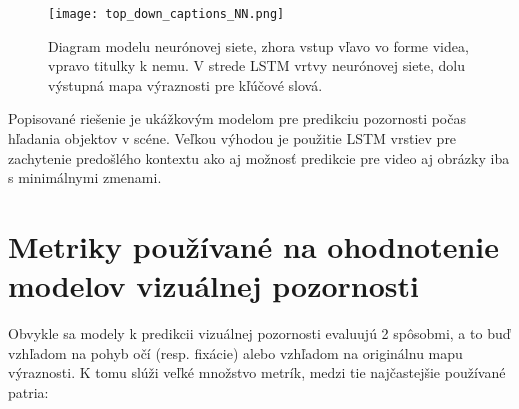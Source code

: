\begin{figure}[H]
	\begin{center}
		\texttt{[image: top\_down\_captions\_NN.png]}
		\caption[Model neurónovej siete pre predikciu na základe kľúčových slov]{Diagram modelu neurónovej siete\cite{ramanishka2017top}, zhora vstup vľavo vo forme videa, vpravo titulky k nemu. V strede LSTM vrtvy neurónovej siete, dolu výstupná mapa výraznosti pre kľúčové slová. \label{top_down_captions_model_image}}
	\end{center}
\end{figure}

Popisované riešenie je ukážkovým modelom pre predikciu pozornosti počas hľadania objektov v scéne. Veľkou výhodou je použitie LSTM vrstiev pre zachytenie predošlého kontextu ako aj možnosť predikcie pre video aj obrázky iba s minimálnymi zmenami.

\section{Metriky používané na ohodnotenie modelov vizuálnej pozornosti}
\label{metric}

Obvykle sa modely k predikcii vizuálnej pozornosti evaluujú 2 spôsobmi, a to buď vzhľadom na pohyb očí (resp. fixácie) alebo vzhľadom na originálnu mapu výraznosti. K tomu slúži veľké množstvo metrík\cite{metriky}, medzi tie najčastejšie používané patria:

